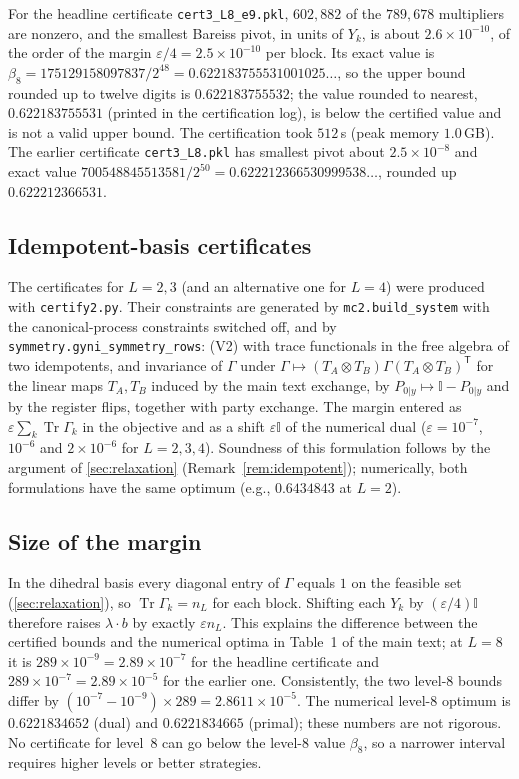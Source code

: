 \documentclass[aps,pra,onecolumn,notitlepage,superscriptaddress,longbibliography,nofootinbib,11pt]{revtex4-2}
\theoremstyle{remark}
\newcommand{\Tr}{\operatorname{Tr}}
\newcommand{\one}{\mathbb{I}}
\newcommand{\tp}{\mathsf{T}}
\newcommand{\file}[1]{\texttt{#1}}
\begin{document}
For the headline certificate \file{cert3\_L8\_e9.pkl}, $602{,}882$ of the $789{,}678$ multipliers are nonzero, and the smallest Bareiss pivot, in units of $Y_k$, is about $2.6\times10^{-10}$, of the order of the margin $\varepsilon/4=2.5\times10^{-10}$ per block. Its exact value is $\beta_8=175129158097837/2^{48}=0.622183755531001025\ldots$, so the upper bound rounded up to twelve digits is $0.622183755532$; the value rounded to nearest, $0.622183755531$ (printed in the certification log), is below the certified value and is not a valid upper bound. The certification took $512$\,s (peak memory $1.0$\,GB). The earlier certificate \file{cert3\_L8.pkl} has smallest pivot about $2.5\times10^{-8}$ and exact value $700548845513581/2^{50}=0.622212366530999538\ldots$, rounded up $0.622212366531$.

\subsection{Idempotent-basis certificates}\label{sec:idempotent}

The certificates for $L=2,3$ (and an alternative one for $L=4$) were produced with \file{certify2.py}. Their constraints are generated by \file{mc2.build\_system} with the canonical-process constraints switched off, and by \file{symmetry.gyni\_symmetry\_rows}: (V2) with trace functionals in the free algebra of two idempotents, and invariance of $\Gamma$ under $\Gamma\mapsto(T_A\otimes T_B)\Gamma(T_A\otimes T_B)^\tp$ for the linear maps $T_A,T_B$ induced by the main text exchange, by $P_{0|y}\mapsto\one-P_{0|y}$ and by the register flips, together with party exchange. The margin entered as $\varepsilon\sum_k\Tr\Gamma_k$ in the objective and as a shift $\varepsilon\one$ of the numerical dual ($\varepsilon=10^{-7}$, $10^{-6}$ and $2\times10^{-6}$ for $L=2,3,4$). Soundness of this formulation follows by the argument of \ref{sec:relaxation} (Remark~\ref{rem:idempotent}); numerically, both formulations have the same optimum (e.g., $0.6434843$ at $L=2$).

\subsection{Size of the margin}

In the dihedral basis every diagonal entry of $\Gamma$ equals $1$ on the feasible set (\ref{sec:relaxation}), so $\Tr\Gamma_k=n_L$ for each block. Shifting each $Y_k$ by $(\varepsilon/4)\one$ therefore raises $\lambda\cdot b$ by exactly $\varepsilon n_L$. This explains the difference between the certified bounds and the numerical optima in Table~1 of the main text; at $L=8$ it is $289\times10^{-9}=2.89\times10^{-7}$ for the headline certificate and $289\times10^{-7}=2.89\times10^{-5}$ for the earlier one. Consistently, the two level-8 bounds differ by $(10^{-7}-10^{-9})\times289=2.8611\times10^{-5}$. The numerical level-8 optimum is $0.6221834652$ (dual) and $0.6221834665$ (primal); these numbers are not rigorous. No certificate for level~8 can go below the level-8 value $\beta_8$, so a narrower interval requires higher levels or better strategies.
\end{document}
